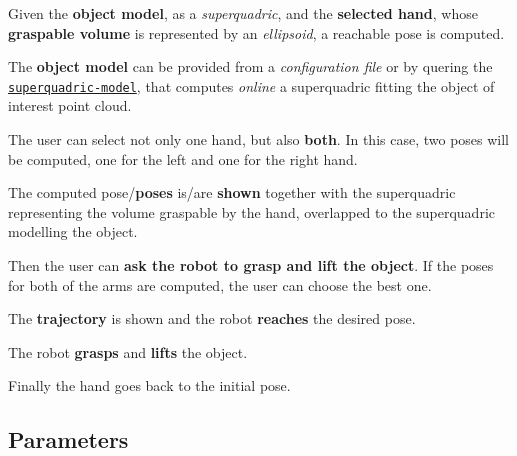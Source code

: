 \begin{DoxyEnumerate}
\item Given the {\bfseries object model}, as a {\itshape superquadric}, and the {\bfseries  selected hand}, whose {\bfseries graspable volume} is represented by an {\itshape ellipsoid}, a reachable pose is computed.
\begin{DoxyItemize}
\item The {\bfseries object model} can be provided from a {\itshape configuration file} or by quering the \href{https://github.com/robotology/superquadric-model}{\tt superquadric-\/model}, that computes {\itshape online} a superquadric fitting the object of interest point cloud.
\item The user can select not only one hand, but also {\bfseries both}. In this case, two poses will be computed, one for the left and one for the right hand.
\end{DoxyItemize}
\item The computed pose/{\bfseries poses} is/are {\bfseries shown} together with the superquadric representing the volume graspable by the hand, overlapped to the superquadric modelling the object.
\item Then the user can {\bfseries ask the robot to grasp and lift the object}. If the poses for both of the arms are computed, the user can choose the best one.
\item The {\bfseries trajectory} is shown and the robot {\bfseries reaches} the desired pose.
\item The robot {\bfseries grasps} and {\bfseries lifts} the object.
\item Finally the hand goes back to the initial pose.
\end{DoxyEnumerate}\hypertarget{group__superquadric-grasping_parameters_sec}{}\subsection{Parameters}\label{group__superquadric-grasping_parameters_sec}

